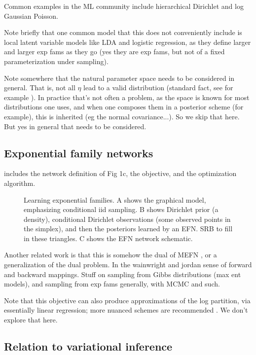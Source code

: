 \documentclass{article}
\begin{document}
Common examples in the ML community include hierarchical Dirichlet and log Gaussian Poisson.

Note briefly that one common model that this does not conveniently include is local latent variable models like LDA and logistic regression, as they define larger and larger exp fams as they go (yes they are exp fams, but not of a fixed parameterization under sampling).

 Note somewhere that the natural parameter space needs to be considered in general.  That is, not all $\eta$ lead to a valid distribution (standard fact, see for example \cite{wainwright2008graphical}).  In practice that's not often a problem, as the space is known for most distributions one uses, and when one composes them in a posterior scheme (for example), this is inherited (eg the normal covariance...).  So we skip that here.  But yes in general that needs to be considered.


 \subsection{Exponential family networks}

includes the network definition of Fig 1c, the objective, and the optimization algorithm.
 
 \begin{figure}
  \centering

  \caption{Learning exponential families.  A shows the graphical model, emphasizing conditional iid sampling.  B shows Dirichlet prior (a density), conditional Dirichlet observations (some observed points in the simplex), and then the posteriors learned by an EFN.  SRB to fill in these triangles.   C shows the EFN network schematic.}
\end{figure}


Another related work is that this is somehow the dual of MEFN \cite{loaiza2017maximum}, or a generalization of the dual problem.  In the wainwright and jordan sense of forward and backward mappings.
Stuff on sampling from Gibbs distributions (max ent models), and sampling from exp fams generally, with MCMC and such.

Note that this objective can also produce approximations of the log partition, via essentially linear regression; more nuanced schemes are recommended \cite{papamakarios2015distilling}.  We don't explore that here.


 \subsection{Relation to variational inference}
 
\end{document}
